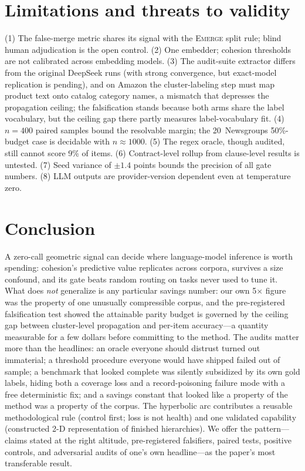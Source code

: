 \documentclass[11pt]{article}
\begin{document}
\section{Limitations and threats to validity}
(1) The false-merge metric shares its signal with the \textsc{Emerge} split rule; blind human adjudication is the open control. (2) One embedder; cohesion thresholds are not calibrated across embedding models. (3) The audit-suite extractor differs from the original DeepSeek runs (with strong convergence, but exact-model replication is pending), and on Amazon the cluster-labeling step must map product text onto catalog category names, a mismatch that depresses the propagation ceiling; the falsification stands because both arms share the label vocabulary, but the ceiling gap there partly measures label-vocabulary fit. (4) $n{=}400$ paired samples bound the resolvable margin; the 20~Newsgroups 50\%-budget case is decidable with $n{\approx}1000$. (5) The regex oracle, though audited, still cannot score 9\% of items. (6) Contract-level rollup from clause-level results is untested. (7) Seed variance of $\pm1.4$ points bounds the precision of all gate numbers. (8) LLM outputs are provider-version dependent even at temperature zero.

\section{Conclusion}
A zero-call geometric signal can decide where language-model inference is worth spending: cohesion's predictive value replicates across corpora, survives a size confound, and its gate beats random routing on tasks never used to tune it. What does \emph{not} generalize is any particular savings number: our own 5$\times$ figure was the property of one unusually compressible corpus, and the pre-registered falsification test showed the attainable parity budget is governed by the ceiling gap between cluster-level propagation and per-item accuracy---a quantity measurable for a few dollars before committing to the method. The audits matter more than the headlines: an oracle everyone should distrust turned out immaterial; a threshold procedure everyone would have shipped failed out of sample; a benchmark that looked complete was silently subsidized by its own gold labels, hiding both a coverage loss and a record-poisoning failure mode with a free deterministic fix; and a savings constant that looked like a property of the method was a property of the corpus. The hyperbolic arc contributes a reusable methodological rule (control first; loss is not health) and one validated capability (constructed 2-D representation of finished hierarchies). We offer the pattern---claims stated at the right altitude, pre-registered falsifiers, paired tests, positive controls, and adversarial audits of one's own headline---as the paper's most transferable result.
\end{document}
